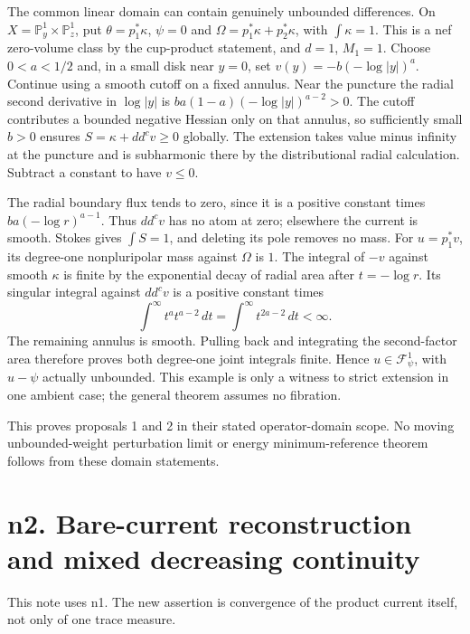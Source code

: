 \documentclass[
  11pt,
]{article}
\begin{document}
The common linear domain can contain genuinely unbounded differences. On
\(X=\mathbb P^1_y\times\mathbb P^1_z\), put \(\theta=p_1^*\kappa\),
\(\psi=0\) and \(\Omega=p_1^*\kappa+p_2^*\kappa\), with
\(\int\kappa=1\). This is a nef zero-volume class by the cup-product
statement, and \(d=1\), \(M_1=1\). Choose \(0<a<1/2\) and, in a small
disk near \(y=0\), set \(v(y)=-b(-\log|y|)^a\). Continue using a smooth
cutoff on a fixed annulus. Near the puncture the radial second
derivative in \(\log|y|\) is \(ba(1-a)(-\log|y|)^{a-2}>0\). The cutoff
contributes a bounded negative Hessian only on that annulus, so
sufficiently small \(b>0\) ensures \(S=\kappa+dd^cv\geq0\) globally. The
extension takes value minus infinity at the puncture and is subharmonic
there by the distributional radial calculation. Subtract a constant to
have \(v\leq0\).

The radial boundary flux tends to zero, since it is a positive constant
times \(ba(-\log r)^{a-1}\). Thus \(dd^cv\) has no atom at zero;
elsewhere the current is smooth. Stokes gives \(\int S=1\), and deleting
its pole removes no mass. For \(u=p_1^*v\), its degree-one nonpluripolar
mass against \(\Omega\) is \(1\). The integral of \(-v\) against smooth
\(\kappa\) is finite by the exponential decay of radial area after
\(t=-\log r\). Its singular integral against \(dd^cv\) is a positive
constant times \[
\int^\infty t^a t^{a-2}\,dt=\int^\infty t^{2a-2}\,dt<\infty.
\] The remaining annulus is smooth. Pulling back and integrating the
second-factor area therefore proves both degree-one joint integrals
finite. Hence \(u\in\mathcal F^1_\psi\), with \(u-\psi\) actually
unbounded. This example is only a witness to strict extension in one
ambient case; the general theorem assumes no fibration.

This proves proposals 1 and 2 in their stated operator-domain scope. No
moving unbounded-weight perturbation limit or energy minimum-reference
theorem follows from these domain statements.

\section{n2. Bare-current reconstruction and mixed decreasing
continuity}\label{n2.-bare-current-reconstruction-and-mixed-decreasing-continuity}

This note uses n1. The new assertion is convergence of the product
current itself, not only of one trace measure.
\end{document}
